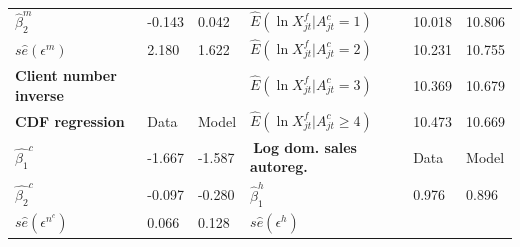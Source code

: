 \begin{table}
{\begin{tabular}{llllll}
        $\widehat{\beta }_{2}^{m}$                                                    & {-0.143}                                       & {
        0.042}                                                                        & $\widehat{E}(\ln X_{jt}^{f}|A_{jt}^{c}=1)$     & {
        10.018}                                                                       & {10.806} \\
        $s\widehat{e}(\epsilon ^{m})$                                                 & {2.180}                                        &
        {1.622}                                                                       & $\widehat{E}(\ln X_{jt}^{f}|A_{jt}^{c}=2)$     &
        {10.231}                                                                      & {10.755} \\
        \textbf{Client number inverse}                                                & {}                                             & {}
                                                                                      & $\widehat{E}(\ln X_{jt}^{f}|A_{jt}^{c}=3)$     & {10.369}      &
        {10.679} \\
        \textbf{CDF regression}                                                       & {Data}                                         & {Model
        }                                                                             & $\widehat{E}(\ln X_{jt}^{f}|A_{jt}^{c}\geq 4)$ & {
        10.473}                                                                       & {10.669} \\ \cline{1-3}
        $\widehat{\beta _{1}}^{c}$                                                    & {-1.667}                                       & {
        -1.587}                                                                       & $\ $\textbf{Log dom. sales autoreg.}           & {Data}        &
        {Model} \\ \cline{4-6}
        $\widehat{\beta _{2}}^{c}$                                                    & {-0.097}                                       & {
        -0.280}                                                                       & $\widehat{\beta }_{1}^{h}$                     & {0.976}       &
        {0.896} \\
        $s\widehat{e}(\epsilon ^{n^{c}})$                                             & {0.066}                                        &
        {0.128}                                                                       & $s\widehat{e}(\epsilon ^{h})$                  &

\end{tabular}}
\end{table}
